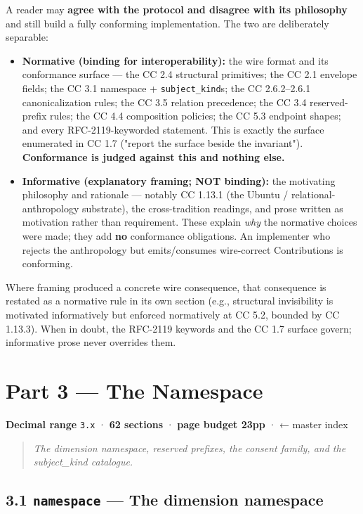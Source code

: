 \documentclass[11pt]{article}
\begin{document}
A reader may \textbf{agree with the protocol and disagree with its philosophy} and still build a fully conforming implementation. The two are deliberately separable:


\begin{itemize}\setlength\itemsep{0pt}
\item \textbf{Normative (binding for interoperability):} the wire format and its conformance surface — the CC 2.4 structural primitives; the CC 2.1 envelope fields; the CC 3.1 namespace + \texttt{subject\_kind}s; the CC 2.6.2–2.6.1 canonicalization rules; the CC 3.5 relation precedence; the CC 3.4 reserved-prefix rules; the CC 4.4 composition policies; the CC 5.3 endpoint shapes; and every RFC-2119-keyworded statement. This is exactly the surface enumerated in CC 1.7 ("report the surface beside the invariant"). \textbf{Conformance is judged against this and nothing else.}
\item \textbf{Informative (explanatory framing; NOT binding):} the motivating philosophy and rationale — notably CC 1.13.1 (the Ubuntu / relational-anthropology substrate), the cross-tradition readings, and prose written as motivation rather than requirement. These explain \textit{why} the normative choices were made; they add \textbf{no} conformance obligations. An implementer who rejects the anthropology but emits/consumes wire-correct Contributions is conforming.
\end{itemize}


Where framing produced a concrete wire consequence, that consequence is restated as a normative rule in its own section (e.g., structural invisibility is motivated informatively but enforced normatively at CC 5.2, bounded by CC 1.13.3). When in doubt, the RFC-2119 keywords and the CC 1.7 surface govern; informative prose never overrides them.


\clearpage
\section*{Part 3 — The Namespace}


\textbf{Decimal range} \texttt{3.x} · \textbf{62 sections} · \textbf{page budget 23pp} · ← master index


\begin{quote}\itshape The dimension namespace, reserved prefixes, the consent family, and the subject\_kind catalogue.\end{quote}



\subsection*{3.1 \texttt{namespace} — The dimension namespace}
\end{document}
